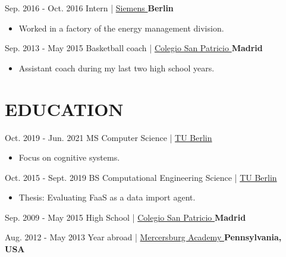 \documentclass[]{commands}
\begin{document}
\begin{entrylist}
  \entry
    {Sep. 2016 - Oct. 2016}
    {Intern | }
    { \href{https://www.siemens.com/global/en.html}{\small Siemens \faMousePointer}}
    {\normalsize\textbf{\color{ipsgreen}\faMapMarker\space Berlin}}
    {\jobspace
    \begin{itemize}[leftmargin=*, itemsep = 0.1em]
        \item Worked in a factory of the energy management division. \\
    \end{itemize}}
    
  \entry
    {Sep. 2013 - May 2015}
    {Basketball coach | }
    { \href{https://colegiosanpatriciomadrid.com/en/our-campuses/school-el-soto/extra-curricular-activities/}{\small Colegio San Patricio \faMousePointer}}
    {\normalsize\textbf{\color{ipsgreen}\faMapMarker\space Madrid}}
    {\jobspace
    \begin{itemize}[leftmargin=*, itemsep = 0.1em]
        \item Assistant coach during my last two high school years. \\
    \end{itemize}}
    
\end{entrylist}

\section{EDUCATION}
\begin{entrylist}
 
   \entry
    {Oct. 2019 - Jun. 2021}
    {MS Computer Science | }
    { \href{https://www.tu.berlin/en/}{\small TU Berlin \faMousePointer}}
    {}
    {\jobspace
    \begin{itemize}[leftmargin=*, itemsep = 0.1em]
        \item Focus on cognitive systems.\\
    \end{itemize}}
    
  \entry
    {Oct. 2015 - Sept. 2019}
    {BS Computational Engineering Science | }
    { \href{https://www.tu.berlin/en/}{\small TU Berlin \faMousePointer}}
    {}
    {\jobspace
    \begin{itemize}[leftmargin=*, itemsep = 0.1em]
        \item Thesis: Evaluating FaaS as a data import agent.\\
    \end{itemize}}

  \entry
    {Sep. 2009 - May 2015}
    {High School | }
    { \href{https://colegiosanpatriciomadrid.com/en}{\small Colegio San Patricio \faMousePointer}}    {\normalsize\textbf{\color{ipsgreen}\faMapMarker\space Madrid}}
    {}
    
  \entry
    {Aug. 2012 - May 2013}
    {Year abroad | }
    { \href{https://www.mercersburg.edu/}{\small Mercersburg Academy \faMousePointer}}    {\normalsize\textbf{\color{ipsgreen}\faMapMarker\space Pennsylvania, USA}}
    {}
\end{entrylist}
\end{document}
